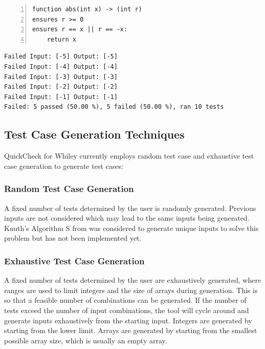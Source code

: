 \begin{lstlisting}[language=Whiley, tabsize=3, numbers=left,
label={lst:whileyAbs}, caption={Whiley program for an incorrect implementation of the abs function}]
function abs(int x) -> (int r)
ensures r >= 0
ensures r == x || r == -x:
	return x
\end{lstlisting}

\begin{lstlisting}[label={lst:whileyQCResults},
caption={Results of executing the tool on Listing \ref{lst:whileyAbs}}, ]
Failed Input: [-5] Output: [-5]
Failed Input: [-4] Output: [-4]
Failed Input: [-3] Output: [-3]
Failed Input: [-2] Output: [-2]
Failed Input: [-1] Output: [-1]
Failed: 5 passed (50.00 %), 5 failed (50.00 %), ran 10 tests
\end{lstlisting}

\subsection{Test Case Generation Techniques}

QuickCheck for Whiley currently employs random test case and exhaustive test case generation to generate test cases: 

\subsubsection{Random Test Case Generation}

A fixed number of tests determined by the user is randomly generated. Previous inputs are not considered which may lead to the same inputs being generated.
Knuth's Algorithm S from \cite{artProgv2} was considered to generate unique inputs to solve this problem but has not been implemented yet.

\subsubsection{Exhaustive Test Case Generation}
A fixed number of tests determined by the user are exhaustively generated, where ranges are used to limit integers and the size of arrays during generation. This is so that a feasible number of combinations can be generated. If the number of tests exceed the number of input combinations, the tool will cycle around and generate inputs exhaustively from the starting input. Integers are generated by starting from the lower limit. Arrays are generated by starting from the smallest possible array size, which is usually an empty array. 

